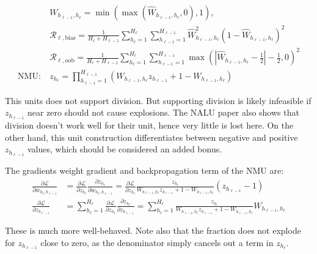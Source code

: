 \begin{equation}
\begin{aligned}
&W_{h_{\ell-1},h_\ell} = \min(\max(\hat{W}_{h_{\ell-1},h_\ell}, 0), 1), \\
&\mathcal{R}_{\ell,\mathrm{bias}} = \frac{1}{H_\ell + H_{\ell-1}} \sum_{h_\ell=1}^{H_\ell} \sum_{h_{\ell-1}=1}^{H_{\ell-1}} \hat{W}_{h_{\ell-1},h_\ell}^2 (1 - \hat{W}_{h_{\ell-1},h_\ell})^2 \\
&\mathcal{R}_{\ell,\mathrm{oob}} = \frac{1}{H_\ell + H_{\ell-1}} \sum_{h_\ell=1}^{H_\ell} \sum_{h_{\ell-1}=1}^{H_{\ell-1}} \max\left(\left|\hat{W}_{h_{\ell-1},h_\ell} - \frac{1}{2}\right| - \frac{1}{2}, 0\right)^2 \\
\textrm{NMU}:\ &z_{h_\ell} = \prod_{h_{\ell-1}=1}^{H_{\ell-1}} \left(W_{h_{\ell-1},h_\ell} z_{h_{\ell-1}} + 1 - W_{h_{\ell-1},h_\ell} \right)
\end{aligned}
\end{equation}

This units does not support division. But supporting division is likely infeasible if $z_{h_{\ell-1}}$ near zero should not cause explosions. The NALU paper also shows that division doesn't work well for their unit, hence very little is lost here. On the other hand, this unit construction differentiates between negative and positive $z_{h_{\ell-1}}$ values, which should be considered an added bonus.

The gradients weight gradient and backpropagation term of the NMU are:
\begin{equation}
\begin{aligned}
\frac{\partial \mathcal{L}}{\partial w_{h_{\ell}, h_{\ell - 1}}} &= \frac{\partial \mathcal{L}}{\partial z_{h_\ell}} \frac{\partial z_{h_\ell}}{\partial w_{h_{\ell}, h_{\ell - 1}}} = \frac{\partial \mathcal{L}}{\partial z_{h_\ell}} \frac{z_{h_\ell}}{W_{h_{\ell-1},h_\ell} z_{h_{\ell-1}} + 1 - W_{h_{\ell-1},h_\ell}} \left(z_{h_{\ell-1}} - 1\right) \\
\frac{\partial \mathcal{L}}{\partial z_{h_{\ell-1}}} &= \sum_{h_\ell = 1}^{H_\ell} \frac{\partial \mathcal{L}}{\partial z_{h_\ell}} \frac{\partial z_{h_\ell}}{\partial z_{h_{\ell-1}}} = \sum_{h_\ell = 1}^{H_\ell} \frac{z_{h_\ell}}{W_{h_{\ell-1},h_\ell} z_{h_{\ell-1}} + 1 - W_{h_{\ell-1},h_\ell}} W_{h_{\ell-1},h_\ell}
\end{aligned}
\end{equation}

These is much more well-behaved. Note also that the fraction does not explode for $z_{h_{\ell-1}}$ close to zero, as the denominator simply cancels out a term in $z_{h_\ell}$.

